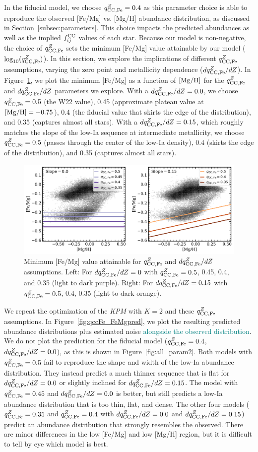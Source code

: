 \documentclass[modern]{aastex631}
\newcommand{\mgh}{[{\rm Mg}/{\rm H}]}
\newcommand{\qccFe}{q_{{\rm CC, Fe}}^{Z}}
\newcommand{\dqccFe}{dq_{{\rm CC, Fe}}^{Z}/dZ}
\newcommand{\fcc}{f_{ij}^{\rm CC}}
\newcommand{\add}[1]{\textcolor{teal}{#1}}
\newcommand{\name}{\textsl{KPM}}
\begin{document}
In the fiducial model, we choose $\qccFe = 0.4$ as this parameter choice is able to reproduce the observed [Fe/Mg] vs. [Mg/H] abundance distribution, as discussed in Section~\ref{subsec:parameters}. This choice impacts the predicted abundances as well as the implied $\fcc$ values of each star. Because our model is non-negative, the choice of $\qccFe$ sets the minimum [Fe/Mg] value attainable by our model ($\log_{10}(\qccFe)$). In this section, we explore the implications of different $\qccFe$ assumptions, varying the zero point and metallicity dependence ($\dqccFe$). In Figure~\ref{fig:qccFe_FeMg}, we plot the minimum [Fe/Mg] as a function of $\mgh$ for the $\qccFe$ and $\dqccFe$ parameters we explore. With a $\dqccFe=0.0$, we choose $\qccFe=0.5$ (the W22 value), 0.45 (approximate plateau value at $\mgh=-0.75$), 0.4 (the fiducial value that skirts the edge of the distribution), and 0.35 (captures almost all stars). With a $\dqccFe=0.15$, which roughly matches the slope of the low-Ia sequence at intermediate metallicity, we choose $\qccFe=0.5$ (passes through the center of the low-Ia density), 0.4 (skirts the edge of the distribution), and 0.35 (captures almost all stars).

\begin{figure}[htb!]
    \centering
    \includegraphics[width=\textwidth]{Paper/Figures/qccFe_FeMg.pdf}
    \caption{Minimum [Fe/Mg] value attainable for $\qccFe$ and $\dqccFe$ assumptions. Left: For $\dqccFe=0$ with $\qccFe=0.5$, 0.45, 0.4, and 0.35 (light to dark purple). Right: For $\dqccFe=0.15$ with $\qccFe=0.5$, 0.4, 0.35 (light to dark orange).}
    \label{fig:qccFe_FeMg}
\end{figure}

We repeat the optimization of the \name{} with $K=2$ and these $\qccFe$ assumptions. In Figure~\ref{fig:qccFe_FeMgpred}, we plot the resulting predicted abundance distributions plus estimated noise \add{alongside the observed distribution}. We do not plot the prediction for the fiducial model ($\qccFe=0.4$, $\dqccFe=0.0$), as this is shown in Figure~\ref{fig:all_param2}. Both models with $\qccFe=0.5$ fail to reproduce the shape and width of the low-Ia abundance distribution. They instead predict a much thinner sequence that is flat for $\dqccFe=0.0$ or slightly inclined for $\dqccFe=0.15$. The model with $\qccFe=0.45$ and $\dqccFe=0.0$ is better, but still predicts a low-Ia abundance distribution that is too thin, flat, and dense. The other four models ($\qccFe=0.35$ and $\qccFe=0.4$ with $\dqccFe=0.0$ and $\dqccFe=0.15$) predict an abundance distribution that strongly resembles the observed. There are minor differences in the low [Fe/Mg] and low [Mg/H] region, but it is difficult to tell by eye which model is best.
\end{document}
